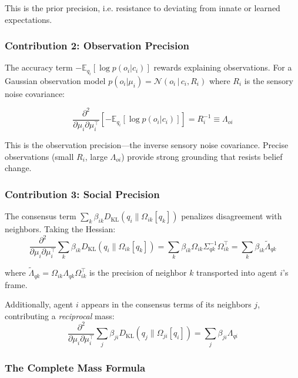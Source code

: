 \documentclass[12pt]{article}
\begin{document}
This is the prior precision, i.e. resistance to deviating from innate or learned expectations.

\subsubsection{Contribution 2: Observation Precision}

The accuracy term $-\mathbb{E}_{q_i}[\log p(o_i|c_i)]$ rewards explaining observations. For a Gaussian observation model $p(o_i|\mu_i) = \mathcal{N}(o_i \,|\, c_i, R_i)$ where $R_i$ is the sensory noise covariance:

\begin{equation}
\frac{\partial^2}{\partial\mu_i\partial\mu_i^\top} \left[-\mathbb{E}_{q_i}[\log p(o_i|c_i)]\right] = R_i^{-1} \equiv \Lambda_{oi}
\end{equation}

This is the observation precision—the inverse sensory noise covariance. Precise observations (small $R_i$, large $\Lambda_{oi}$) provide strong grounding that resists belief change.


\subsubsection{Contribution 3: Social Precision}

The consensus term $\sum_k \beta_{ik} D_{\mathrm{KL}}(q_i \| \Omega_{ik}[q_k])$ penalizes disagreement with neighbors. Taking the Hessian:
\begin{equation}
\frac{\partial^2}{\partial\mu_i\partial\mu_i^\top} \sum_k \beta_{ik} D_{\mathrm{KL}}(q_i \| \Omega_{ik}[q_k]) = \sum_k \beta_{ik} \Omega_{ik} \Sigma_{qk}^{-1} \Omega_{ik}^\top = \sum_k \beta_{ik} \tilde{\Lambda}_{qk}
\end{equation}

where $\tilde{\Lambda}_{qk} = \Omega_{ik}\Lambda_{qk}\Omega_{ik}^\top$ is the precision of neighbor $k$ transported into agent $i$'s frame.

Additionally, agent $i$ appears in the consensus terms of its neighbors $j$, contributing a \textit{reciprocal} mass:
\begin{equation}
\frac{\partial^2}{\partial\mu_i\partial\mu_i^\top} \sum_j \beta_{ji} D_{\mathrm{KL}}(q_j \| \Omega_{ji}[q_i]) = \sum_j \beta_{ji} \Lambda_{qi}
\end{equation}

\subsubsection{The Complete Mass Formula}
\end{document}
